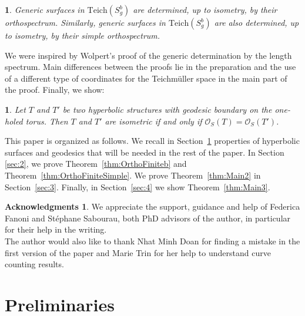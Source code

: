 \documentclass[a4paper,12pt]{article}
\newtheorem*{mainTheoremB}{\theoremnameb}
\newcommand{\theoremnameb}{\hypertarget{thm:Main2Intro}{Theorem~\ref{thm:Main2}}}
\newtheorem*{mainTheoremC}{\theoremnamec}
\newcommand{\theoremnamec}{\hypertarget{thm:Main3Intro}{Theorem~\ref{thm:Main3}}}
\theoremstyle{definition}
\newtheorem*{Ack}{Acknowledgments}
\theoremstyle{remark}
\begin{document}

\begin{mainTheoremB}\label{thm:Main2Intro}
    Generic surfaces in $\mathrm{Teich}(S_g^b)$ are determined, up to isometry, by their orthospectrum. Similarly, generic surfaces in $\mathrm{Teich}(S_g^b)$ are also determined, up to isometry, by their simple orthospectrum. 
\end{mainTheoremB}

We were inspired by Wolpert's proof of the generic determination by the length spectrum. Main differences between the proofs lie in the preparation and the use of a different type of coordinates for the Teichmüller space in the main part of the proof. Finally, we show:

\begin{mainTheoremC}\label{thm:Main3Intro}
    Let $T$ and $T'$ be two hyperbolic structures with geodesic boundary on the one-holed torus.
    Then $T$ and $T'$ are isometric if and only if $\mathcal{O}_S(T)=\mathcal{O}_S(T')$.
\end{mainTheoremC}

This paper is organized as follows. We recall in Section~\ref{sec:1} properties of hyperbolic surfaces and geodesics that will be needed in the rest of the paper. In Section \ref{sec:2}, we prove Theorem~\ref{thm:OrthoFiniteb} and Theorem~\ref{thm:OrthoFiniteSimple}. We prove Theorem~\ref{thm:Main2} in Section~\ref{sec:3}. Finally, in Section~\ref{sec:4} we show Theorem~\ref{thm:Main3}.


\begin{Ack}
    We appreciate the support, guidance and help of Federica Fanoni and Stéphane Sabourau, both PhD advisors of the author, in particular for their help in the writing. \\
    
    The author would also like to thank Nhat Minh Doan for finding a mistake in the first version of the paper and Marie Trin for her help to understand curve counting results.
\end{Ack}










\section{Preliminaries}\label{sec:1}
\end{document}
